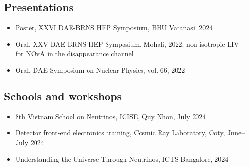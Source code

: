 \subsection*{Presentations}
\begin{itemize}
\item Poster, XXVI DAE-BRNS HEP Symposium, BHU Varanasi, 2024
\item Oral, XXV DAE-BRNS HEP Symposium, Mohali, 2022: non-isotropic LIV for NOvA in the disappearance channel
\item Oral, DAE Symposium on Nuclear Physics, vol. 66, 2022
\end{itemize}

\subsection*{Schools and workshops}
\begin{itemize}
\item 8th Vietnam School on Neutrinos, ICISE, Quy Nhon, July 2024
\item Detector front-end electronics training, Cosmic Ray Laboratory, Ooty, June--July 2024
\item Understanding the Universe Through Neutrinos, ICTS Bangalore, 2024
\end{itemize}
